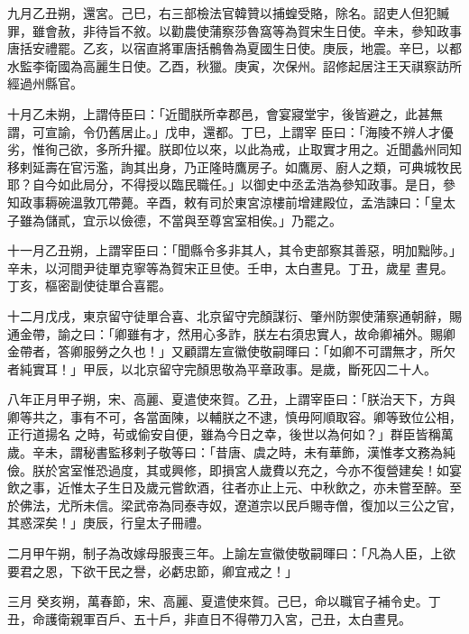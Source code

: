 \begin{pinyinscope}
 九月乙丑朔，還宮。己巳，右三部檢法官韓贊以捕蝗受賂，除名。詔吏人但犯贓罪，雖會赦，非待旨不敘。以勸農使蒲察莎魯窩等為賀宋生日使。辛未，參知政事唐括安禮罷。乙亥，以宿直將軍唐括鶻魯為夏國生日使。庚辰，地震。辛巳，以都水監李衛國為高麗生日使。乙酉，秋獵。庚寅，次保州。詔修起居注王天祺察訪所經過州縣官。



 十月乙未朔，上謂侍臣曰：「近聞朕所幸郡邑，會宴寢堂宇，後皆避之，此甚無謂，可宣諭，令仍舊居止。」戊申，還都。丁巳，上謂宰
 臣曰：「海陵不辨人才優劣，惟徇己欲，多所升擢。朕即位以來，以此為戒，止取實才用之。近聞蠡州同知移剌延壽在官污濫，詢其出身，乃正隆時鷹房子。如鷹房、廚人之類，可典城牧民耶？自今如此局分，不得授以臨民職任。」以御史中丞孟浩為參知政事。是日，參知政事耨碗溫敦兀帶薨。辛酉，敕有司於東宮涼樓前增建殿位，孟浩諫曰：「皇太子雖為儲貳，宜示以儉德，不當與至尊宮室相俟。」乃罷之。



 十一月乙丑朔，上謂宰臣曰：「聞縣令多非其人，其令吏部察其善惡，明加黜陟。」辛未，以河間尹徒單克寧等為賀宋正旦使。壬申，太白晝見。丁丑，歲星
 晝見。丁亥，樞密副使徒單合喜罷。



 十二月戊戌，東京留守徒單合喜、北京留守完顏謀衍、肇州防禦使蒲察通朝辭，賜通金帶，諭之曰：「卿雖有才，然用心多詐，朕左右須忠實人，故命卿補外。賜卿金帶者，答卿服勞之久也！」又顧謂左宣徽使敬嗣暉曰：「如卿不可謂無才，所欠者純實耳！」甲辰，以北京留守完顏思敬為平章政事。是歲，斷死囚二十人。



 八年正月甲子朔，宋、高麗、夏遣使來賀。乙丑，上謂宰臣曰：「朕治天下，方與卿等共之，事有不可，各當面陳，以輔朕之不逮，慎毋阿順取容。卿等致位公相，正行道揚名
 之時，茍或偷安自便，雖為今日之幸，後世以為何如？」群臣皆稱萬歲。辛未，謂秘書監移剌子敬等曰：「昔唐、虞之時，未有華飾，漢惟孝文務為純儉。朕於宮室惟恐過度，其或興修，即損宮人歲費以充之，今亦不復營建矣！如宴飲之事，近惟太子生日及歲元嘗飲酒，往者亦止上元、中秋飲之，亦未嘗至醉。至於佛法，尤所未信。梁武帝為同泰寺奴，遼道宗以民戶賜寺僧，復加以三公之官，其惑深矣！」庚辰，行皇太子冊禮。



 二月甲午朔，制子為改嫁母服喪三年。上諭左宣徽使敬嗣暉曰：「凡為人臣，上欲要君之恩，下欲干民之譽，必虧忠節，卿宜戒之！」



 三月
 癸亥朔，萬春節，宋、高麗、夏遣使來賀。己巳，命以職官子補令史。丁丑，命護衛親軍百戶、五十戶，非直日不得帶刀入宮，己丑，太白晝見。




\end{pinyinscope}
